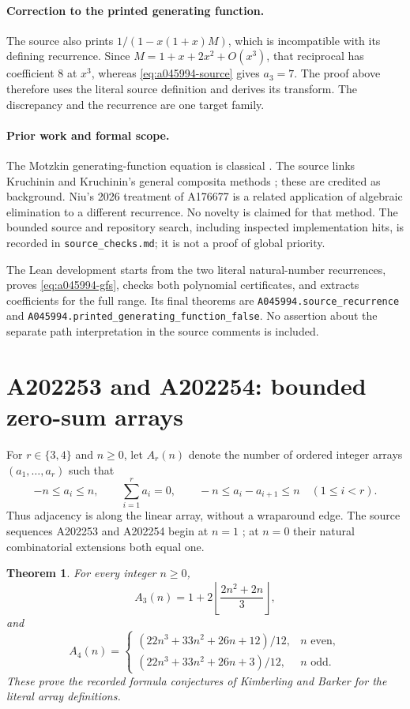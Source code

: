 \documentclass[11pt]{article}
\newtheorem{theorem}{Theorem}[section]
\begin{document}
\paragraph{Correction to the printed generating function.}
The source also prints $1/(1-x(1+x)M)$, which is incompatible with
its defining recurrence. Since $M=1+x+2x^2+O(x^3)$, that reciprocal
has coefficient $8$ at $x^3$, whereas \eqref{eq:a045994-source}
gives $a_3=7$. The proof above therefore uses the literal source
definition and derives its transform. The discrepancy and the
recurrence are one target family.

\paragraph{Prior work and formal scope.}
The Motzkin generating-function equation is classical
\cite{a045994-motzkin}. The source links Kruchinin and Kruchinin's
general composita methods \cite{a045994-kruchinin}; these are
credited as background. Niu's 2026 treatment of A176677
\cite{a045994-niu} is a related application of algebraic elimination
to a different recurrence. No novelty is claimed for that method.
The bounded source and repository search, including inspected
implementation hits, is recorded in \texttt{source\_checks.md};
it is not a proof of global priority.

The Lean development starts from the two literal natural-number
recurrences, proves \eqref{eq:a045994-gfs}, checks both polynomial
certificates, and extracts coefficients for the full range.
Its final theorems are
\texttt{A045994.source\_recurrence} and
\texttt{A045994.printed\_generating\_function\_false}.
No assertion about the separate path interpretation in the source
comments is included.


\section{A202253 and A202254: bounded zero-sum arrays}

For $r\in\{3,4\}$ and $n\ge0$, let $A_r(n)$ denote the number of
ordered integer arrays $(a_1,\ldots,a_r)$ such that
\[
 -n\le a_i\le n,\qquad \sum_{i=1}^r a_i=0,\qquad
 -n\le a_i-a_{i+1}\le n\quad(1\le i<r).
\]
Thus adjacency is along the linear array, without a wraparound edge.
The source sequences A202253 and A202254 begin at $n=1$
\cite{a202253-source,a202254-source}; at $n=0$ their natural
combinatorial extensions both equal one.

\begin{theorem}\label{thm:bounded-zero-sum}
For every integer $n\ge0$,
\[
 A_3(n)=1+2\left\lfloor\frac{2n^2+2n}{3}\right\rfloor,
\]
and
\[
 A_4(n)=
 \begin{cases}
 (22n^3+33n^2+26n+12)/12,&n\text{ even},\\
 (22n^3+33n^2+26n+3)/12,&n\text{ odd}.
 \end{cases}
\]
These prove the recorded formula conjectures of Kimberling and Barker
for the literal array definitions.
\end{theorem}
\end{document}
